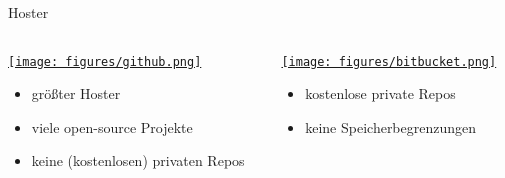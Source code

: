 \begin{frame}{Hoster}
  \begin{columns}[t]
    \begin{column}{0.47\textwidth}
      \href{https://github.com}{\texttt{[image: figures/github.png]}}
      \begin{itemize}
        \item größter Hoster
        \item viele open-source Projekte
        \item keine (kostenlosen) privaten Repos
      \end{itemize}
    \end{column}
    \begin{column}{0.47\textwidth}
      \href{https://bitbucket.org}{\texttt{[image: figures/bitbucket.png]}}
      \begin{itemize}
        \item kostenlose private Repos
        \item keine Speicherbegrenzungen
      \end{itemize}
    \end{column}
  \end{columns}
\end{frame}
